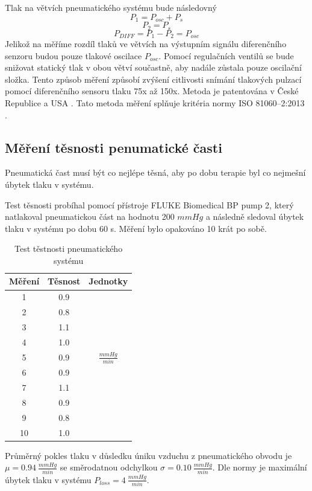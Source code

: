 Tlak na větvích pneumatického systému bude následovný
\begin{equation*}
    P_1 = P_{osc} + P_s
\end{equation*}
\begin{equation*}
    P_2 = P_s
\end{equation*}
\begin{equation}
    P_{DIFF} = P_1 - P_2 = P_{osc}
\end{equation}
Jelikož na měříme rozdíl tlaků ve větvích na výstupním signálu diferenčního senzoru budou pouze tlakové oscilace $P_{osc}$.
Pomocí regulačních ventilů se bude snižovat statický tlak v obou větví součastně, aby nadále zůstala pouze oscilační složka.
Tento způsob měření způsobí zvýšení citlivosti snímání tlakových pulzací pomocí diferenčního sensoru tlaku 75x až 150x. \cite{cite:Habilitace}
Metoda je patentována v České Republice a USA \cite{cite:2}. Tato metoda měření splňuje kritéria normy ISO 81060–2:2013 \cite{cite:Validation}.
\subsection{Měření těsnosti penumatické časti}
Pneumatická čast musí být co nejlépe těsná, aby po dobu terapie byl co nejmešní úbytek tlaku v systému.
\par
Test těsnosti probíhal pomocí přístroje FLUKE Biomedical BP pump 2, který natlakoval pneumatickou část na hodnotu 200 $mmHg$ a následně sledoval úbytek tlaku v systému po dobu 60 s.
Měření bylo opakováno 10 krát po sobě.

\begin{table}[H]
    \label{tab:pressure_test_pneu}
    \caption{Test těstnosti pneumatického systému}
    \begin{ctucolortab}
        \begin{tabular}{ccc}
            \toprule
            Měření & Těsnost & Jednotky           \\ \midrule
            1      & 0.9     &                    \\
            2      & 0.8     &                    \\
            3      & 1.1     &                    \\
            4      & 1.0     &                    \\
            5      & 0.9     & $\frac{mmHg}{min}$ \\
            6      & 0.9     &                    \\
            7      & 1.1     &                    \\
            8      & 0.9     &                    \\
            9      & 0.8     &                    \\
            10     & 1.0     &                    \\
            \bottomrule
        \end{tabular}
    \end{ctucolortab}
\end{table}
Průměrný pokles tlaku v důsledku úniku vzduchu z pneumatického obvodu je $\mu = 0.94 \ \frac{mmHg}{min}$ se směrodatnou odchylkou $\sigma = 0.10  \ \frac{mmHg}{min}$. Dle normy je maximální úbytek tlaku v systému $P_{loss} = 4 \ \frac{mmHg}{min}$.
